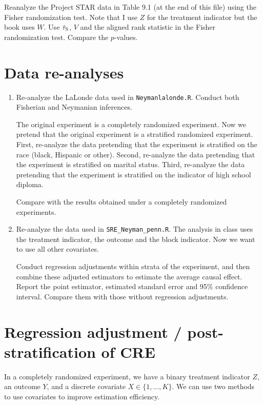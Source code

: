 \documentclass[11pt]{article}
\theoremstyle{definition}
\begin{document}
Reanalyze the Project STAR data in Table 9.1 (at the end of this file) using the Fisher randomization test. Note that I use $Z$ for the treatment indicator but the book uses $W.$ Use $\hat{\tau}_\textsc{S}$, $V$ and the aligned rank statistic in the  Fisher randomization test. Compare the $p$-values.










\section{Data re-analyses}

\begin{enumerate}
[(1)]
\item
Re-analyze the LaLonde data used in \texttt{Neymanlalonde.R}. Conduct both Fisherian and Neymanian inferences. 

The original experiment is a completely randomized experiment. Now we pretend that the original experiment is a stratified randomized experiment.
First, re-analyze the data pretending that the experiment is stratified on the race (black, Hispanic or other). Second, re-analyze the data pretending that the experiment is stratified on marital status. Third, re-analyze the data pretending that the experiment is stratified on the indicator of high school diploma. 

Compare with the results obtained under a completely randomized experiments. 

\item
Re-analyze the data used in \texttt{SRE\_Neyman\_penn.R}. The analysis in class uses the treatment indicator, the outcome and the block indicator. Now we want to use all other covariates. 

Conduct regression adjustments within strata of the experiment, and then combine these adjusted estimators to estimate the average causal effect. Report the point estimator, estimated standard error and 95\% confidence interval. Compare them with those without regression adjustments. 


\end{enumerate}


\section{Regression adjustment / post-stratification of CRE}


In a completely randomized experiment, we have a binary treatment indicator $Z$, an outcome $Y$, and a discrete covariate $X \in \{  1, \ldots, K \}$. We can use two methods to use covariates to improve estimation efficiency. 
\end{document}
